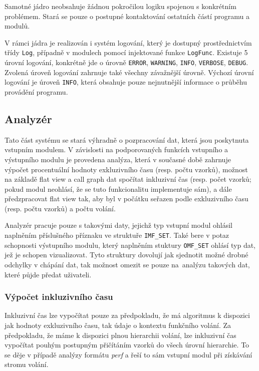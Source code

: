 \documentclass[czech,BP]{thesiskiv}
\begin{document}
Samotné jádro neobsahuje žádnou pokročilou logiku spojenou s konkrétním problémem. Stará se pouze o postupné kontaktování ostatních částí programu a modulů. 

V rámci jádra je realizován i systém logování, který je dostupný prostřednictvím třídy \texttt{Log}, případně v modulech pomocí injektované funkce \texttt{LogFunc}. Existuje 5 úrovní logování, konkrétně jde o úrovně \texttt{ERROR}, \texttt{WARNING}, \texttt{INFO}, \texttt{VERBOSE}, \texttt{DEBUG}. Zvolená úroveň logování zahrnuje také všechny závažnější úrovně. Výchozí úrovní logování je úroveň \texttt{INFO}, která obsahuje pouze nejnutnější informace o průběhu provádění programu.

\subsection{Analyzér}\label{subsec:analyzer}

Tato část systému se stará výhradně o pozpracování dat, která jsou poskytnuta vstupním modulem. V závislosti na podporovaných funkcích vstupního a výstupního modulu je provedena analýza, která v současné době zahrnuje výpočet procentuální hodnoty exkluzivního času (resp. počtu vzorků), možnost na základě flat view a call graph dat spočítat inkluzivní čas (resp. počet vzorků; pokud modul neohlásí, že se tuto funkcionalitu implementuje sám), a dále předzpracovat flat view tak, aby byl v počátku seřazen podle exkluzivního času (resp. počtu vzorků) a počtu volání.

Analyzér pracuje pouze s takovými daty, jejichž typ vstupní modul ohlásil naplněním příslušného příznaku ve struktuře \texttt{IMF\_SET}. Také bere v potaz schopnosti výstupního modulu, který naplněním stuktury \texttt{OMF\_SET} ohlásí typ dat, jež je schopen vizualizovat. Tyto struktury dovolují jak sjednotit možné drobné odchylky v chápání dat, tak možnost omezit se pouze na~analýzu takových dat, které půjde předat uživateli.

\subsubsection*{Výpočet inkluzivního času}

Inkluzivní čas lze vypočítat pouze za předpokladu, že má algoritmus k dispozici jak hodnoty exkluzivního času, tak údaje o kontextu funkčního volání. Za předpokladu, že máme k dispozici plnou hierarchii volání, lze inkluzivní čas vypočítat pouhým postupným přičítáním vzorků do všech úrovní hierarchie. To se děje v případě analýzy formátu \emph{perf} a řeší to sám vstupní modul při získávání stromu volání.
\end{document}
